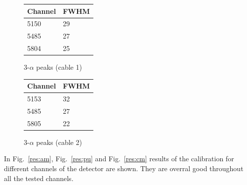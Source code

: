 \begin{figure}[h]
  \centering
  \begin{minipage}[b]{0.45\textwidth}
    \centering
  \begin{tabular}{ll}
    Channel & FWHM \\
    \midrule
    5150 & \num{29} \\
    5485 & \num{27} \\
    5804 & \num{25} \\
    \bottomrule
  \end{tabular}
  \caption{3-$\alpha$ peaks (cable 1)}
  \label{res:peaks:cab1}
  \end{minipage}
  \hfill
  \begin{minipage}[b]{0.45\textwidth}
    \centering
  \begin{tabular}{ll}
    Channel & FWHM \\
    \midrule
    5153 & \num{32} \\
    5485 & \num{27} \\
    5805 & \num{22} \\
    \bottomrule
  \end{tabular}
  \caption{3-$\alpha$ peaks (cable 2)}
  \label{res:peaks:cab2}
  \end{minipage}
\end{figure}

In Fig.~\ref{res:am}, Fig.~\ref{res:pu} and Fig.~\ref{res:cm} results of the calibration for different channels of the detector are shown. They are overral good throughout all the tested channels.

